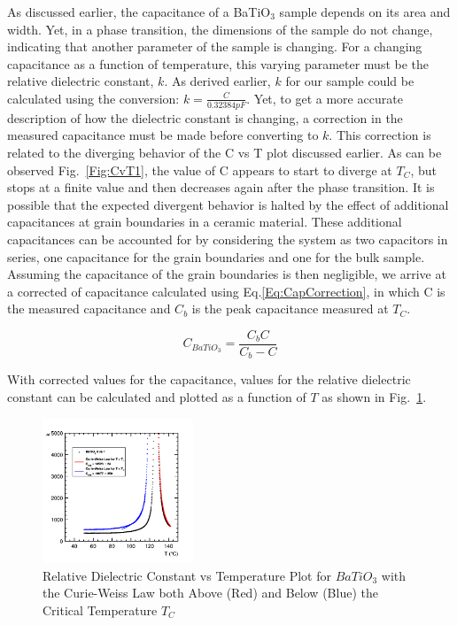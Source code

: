 \documentclass[%
 reprint,
 amsmath,amssymb,
 aps,
 pra,
]{revtex4-1}
\begin{document}
As discussed earlier, the capacitance of a BaTiO$_{3}$ sample depends on its area and width. Yet, in a phase transition, the dimensions of the sample do not change, indicating that another parameter of the sample is changing. For a changing capacitance as a function of temperature, this varying parameter must be the relative dielectric constant, $k$. As derived earlier, $k$ for our sample could be calculated using the conversion: $k = \frac{C}{0.32384 pF}$. Yet, to get a more accurate description of how the dielectric constant is changing, a correction in the measured capacitance must be made before converting to $k$. This correction is related to the diverging behavior of the C vs T plot discussed earlier. As can be observed Fig.~\ref{Fig:CvT1}, the value of C appears to start to diverge at $T_{C}$, but stops at a finite value and then decreases again after the phase transition. It is possible that the expected divergent behavior is halted by the effect of additional capacitances at grain boundaries in a ceramic material. These additional capacitances can be accounted for by considering the system as two capacitors in series, one capacitance for the grain boundaries and one for the bulk sample. Assuming the capacitance of the grain boundaries is then negligible, we arrive at a corrected of capacitance calculated using Eq.\ref{Eq:CapCorrection}, in which C is the measured capacitance and $C_{b}$ is the peak capacitance measured at $T_{C}$.

\begin{equation}\label{Eq:CapCorrection}
C_{BaTiO_{3}} = \frac{C_{b}C}{C_{b} - C}
\end{equation}

\noindent With corrected values for the capacitance, values for the relative dielectric constant can be calculated and plotted as a function of $T$ as shown in Fig.~\ref{Fig:kvT}.

\begin{figure}[H]
	\centering
	\includegraphics[width=0.4\textwidth]{BaTiO3_kvT.png}
	\caption{Relative Dielectric Constant vs Temperature Plot for $BaTiO_{3}$ with the Curie-Weiss Law both Above (Red) and Below (Blue) the Critical Temperature $T_{C}$}
	\label{Fig:kvT}
\end{figure}
\end{document}
